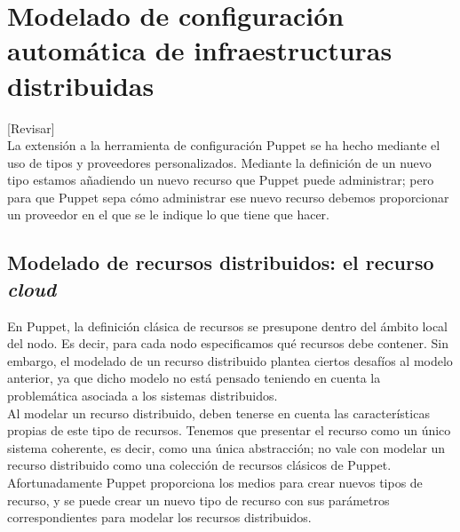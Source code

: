 \chapter{Modelado de configuración automática de infraestructuras distribuidas}
\label{cap:modelado}

[Revisar]\\

La extensión a la herramienta de configuración Puppet se ha hecho mediante el uso de tipos y proveedores personalizados. Mediante la definición de un nuevo tipo estamos añadiendo un nuevo recurso que Puppet puede administrar; pero para que Puppet sepa cómo administrar ese nuevo recurso debemos proporcionar un proveedor en el que se le indique lo que tiene que hacer.


\section{Modelado de recursos distribuidos: el recurso \emph{cloud}}

En Puppet, la definición clásica de recursos se presupone dentro del ámbito local del nodo. Es decir, para cada nodo especificamos qué recursos debe contener. Sin embargo, el modelado de un recurso distribuido plantea ciertos desafíos al modelo anterior, ya que dicho modelo no está pensado teniendo en cuenta la problemática asociada a los sistemas distribuidos. \\


Al modelar un recurso distribuido, deben tenerse en cuenta las características propias de este tipo de recursos. Tenemos que presentar el recurso como un único sistema coherente, es decir, como una única abstracción; no vale con modelar un recurso distribuido como una colección de recursos clásicos de Puppet. Afortunadamente Puppet proporciona los medios para crear nuevos tipos de recurso, y se puede crear un nuevo tipo de recurso con sus parámetros correspondientes para modelar los recursos distribuidos. \\

